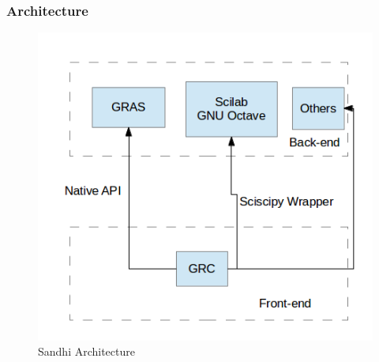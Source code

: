 \documentclass{beamer}
\begin{document}
\begin{frame}
    \frametitle{Architecture}

    \begin{figure}
        \centering
        \begin{minipage}{.5\textwidth}
            \centering
            \includegraphics[width=.9\linewidth]{my_img/architecture.png}
            \caption{Sandhi Architecture}
        \end{minipage}%
    \end{figure}

\end{frame}
\end{document}
